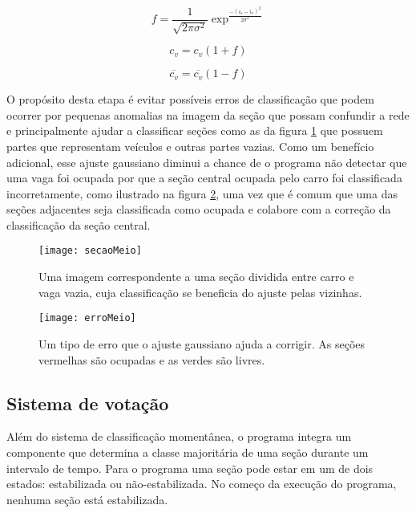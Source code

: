 \begin{equation}
	f = \frac{1}{\sqrt{2\pi\sigma^2}} \exp^{\frac{-(i_s-i_v)^2}{2\sigma^2}} 
\label{eq:gaussiana}
\end{equation}

\begin{equation}
	c_v  = c_v(1+f)
\label{eq:novoCv}
\end{equation}

\begin{equation}
	\overline{c_v}  = \overline{c_v}(1-f)
\label{eq:novoRCv}
\end{equation}

O propósito desta etapa é evitar possíveis erros de classificação que podem ocorrer por pequenas anomalias na imagem da seção que possam confundir a rede e principalmente ajudar a classificar seções como as da figura \ref{fig:secaoMeio} que possuem partes que representam veículos e outras partes vazias. Como um benefício adicional, esse ajuste gaussiano diminui a chance de o programa não detectar que uma vaga foi ocupada por que a seção central ocupada pelo carro foi classificada incorretamente, como ilustrado na figura \ref{fig:erromeio}, uma vez que é comum que uma das seções adjacentes seja classificada como ocupada e colabore com a correção da classificação da seção central.


\begin{figure}
	\centering
	\texttt{[image: secaoMeio]}
	\label{fig:secaoMeio}
	\caption{Uma imagem correspondente a uma seção dividida entre carro e vaga vazia, cuja classificação se beneficia do ajuste pelas vizinhas.}
	\centering
\end{figure}

\begin{figure}
	\centering
	\texttt{[image: erroMeio]}
	\label{fig:erromeio}
	\caption{Um tipo de erro que o ajuste gaussiano ajuda a corrigir. As seções vermelhas são ocupadas e as verdes são livres.}
	\centering
\end{figure}

\subsection{Sistema de votação}

Além do sistema de classificação momentânea, o programa integra um componente que determina a classe majoritária de uma seção durante um intervalo de tempo. Para o programa uma seção pode estar em um de dois estados: estabilizada ou não-estabilizada. No começo da execução do programa, nenhuma seção está estabilizada. 

